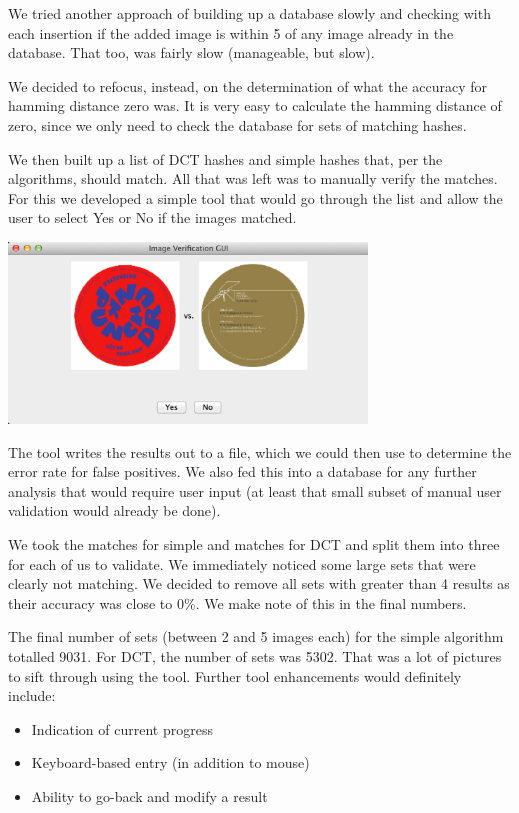 \documentclass[11pt,a4paper,titlepage]{article}
\begin{document}
We tried another approach of building up a database slowly and checking with
each insertion if the added image is within 5 of any image already in the
database.  That too, was fairly slow (manageable, but slow).

We decided to refocus, instead, on the determination of what the accuracy for
hamming distance zero was.  It is very easy to calculate the hamming
distance of zero, since we only need to check the database for sets of matching
hashes.

We then built up a list of DCT hashes and simple hashes that, per the
algorithms, should match.  All that was left was to manually verify the
matches.  For this we developed a simple tool that would go through the list
and allow the user to select Yes or No if the images matched.

\begin{minipage}{\linewidth}
    \centering
    \includegraphics[width=360px]{image_verify.png}
\end{minipage}

The tool writes the results out to a file, which we could then use to determine 
the error rate for false positives.  We also fed this into a database for any
further analysis that would require user input (at least that small subset of
manual user validation would already be done).

We took the matches for simple and matches for DCT and split them into three
for each of us to validate.  We immediately noticed some large sets that were
clearly not matching.  We decided to remove all sets with greater than 4
results as their accuracy was close to 0\%.  We make note of this in the final
numbers.

The final number of sets (between 2 and 5 images each) for the simple algorithm
totalled 9031.  For DCT, the number of sets was 5302.  That was a lot of
pictures to sift through using the tool.  Further tool enhancements would
definitely include:

\begin{itemize}
    \item
        Indication of current progress
    \item
        Keyboard-based entry (in addition to mouse)
    \item
        Ability to go-back and modify a result
\end{itemize}
\end{document}
